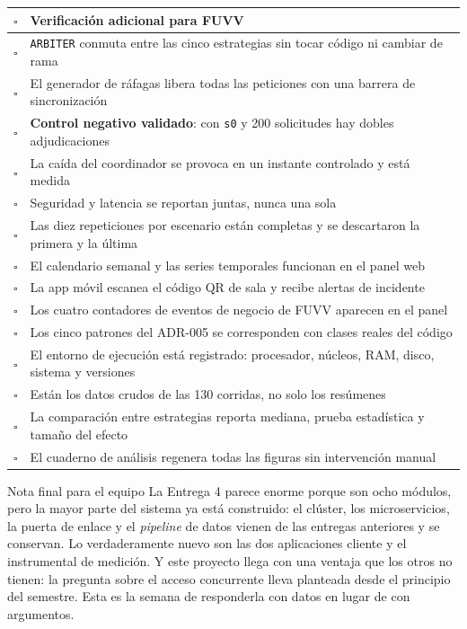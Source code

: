 \documentclass[11pt,a4paper]{article}
\begin{document}
\begin{center}
	\small
	\begin{tabular}{@{}p{0.7cm}p{14.2cm}@{}}
		\toprule
		\textbf{$\square$} & \textbf{Verificación adicional para FUVV} \\
		\midrule
		$\square$ & \texttt{ARBITER} conmuta entre las cinco estrategias sin tocar código ni cambiar de rama \\
		$\square$ & El generador de ráfagas libera todas las peticiones con una barrera de sincronización \\
		$\square$ & \textbf{Control negativo validado}: con \texttt{s0} y 200 solicitudes hay dobles adjudicaciones \\
		$\square$ & La caída del coordinador se provoca en un instante controlado y está medida \\
		$\square$ & Seguridad y latencia se reportan juntas, nunca una sola \\
		$\square$ & Las diez repeticiones por escenario están completas y se descartaron la primera y la última \\
		$\square$ & El calendario semanal y las series temporales funcionan en el panel web \\
		$\square$ & La app móvil escanea el código QR de sala y recibe alertas de incidente \\
		$\square$ & Los cuatro contadores de eventos de negocio de FUVV aparecen en el panel \\
		$\square$ & Los cinco patrones del ADR-005 se corresponden con clases reales del código \\
		$\square$ & El entorno de ejecución está registrado: procesador, núcleos, RAM, disco, sistema y versiones \\
		$\square$ & Están los datos crudos de las 130 corridas, no solo los resúmenes \\
		$\square$ & La comparación entre estrategias reporta mediana, prueba estadística y tamaño del efecto \\
		$\square$ & El cuaderno de análisis regenera todas las figuras sin intervención manual \\
		\bottomrule
	\end{tabular}
\end{center}

\vspace{6pt}
\begin{uteqbox}{Nota final para el equipo}
	La Entrega 4 parece enorme porque son ocho módulos, pero la mayor parte del sistema ya está construido: el clúster, los microservicios, la puerta de enlace y el \emph{pipeline} de datos vienen de las entregas anteriores y se conservan. Lo verdaderamente nuevo son las dos aplicaciones cliente y el instrumental de medición. Y este proyecto llega con una ventaja que los otros no tienen: la pregunta sobre el acceso concurrente lleva planteada desde el principio del semestre. Esta es la semana de responderla con datos en lugar de con argumentos.
\end{uteqbox}
\end{document}
